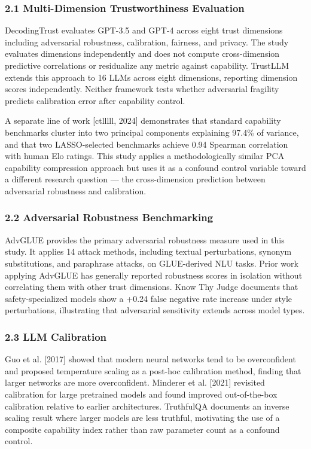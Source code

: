 
\subsubsection{2.1 Multi-Dimension Trustworthiness Evaluation}

DecodingTrust \citep{Wangetal2023} evaluates GPT-3.5 and GPT-4 across eight trust dimensions including adversarial robustness, calibration, fairness, and privacy. The study evaluates dimensions independently and does not compute cross-dimension predictive correlations or residualize any metric against capability. TrustLLM \citep{Sunetal2024} extends this approach to 16 LLMs across eight dimensions, reporting dimension scores independently. Neither framework tests whether adversarial fragility predicts calibration error after capability control.

A separate line of work [ctlllll, 2024] demonstrates that standard capability benchmarks cluster into two principal components explaining 97.4\% of variance, and that two LASSO-selected benchmarks achieve 0.94 Spearman correlation with human Elo ratings. This study applies a methodologically similar PCA capability compression approach but uses it as a confound control variable toward a different research question — the cross-dimension prediction between adversarial robustness and calibration.

\subsubsection{2.2 Adversarial Robustness Benchmarking}

AdvGLUE \citep{Wangetal2021} provides the primary adversarial robustness measure used in this study. It applies 14 attack methods, including textual perturbations, synonym substitutions, and paraphrase attacks, on GLUE-derived NLU tasks. Prior work applying AdvGLUE has generally reported robustness scores in isolation without correlating them with other trust dimensions. Know Thy Judge \citep{Eirasetal2025} documents that safety-specialized models show a +0.24 false negative rate increase under style perturbations, illustrating that adversarial sensitivity extends across model types.

\subsubsection{2.3 LLM Calibration}

Guo et al. [2017] showed that modern neural networks tend to be overconfident and proposed temperature scaling as a post-hoc calibration method, finding that larger networks are more overconfident. Minderer et al. [2021] revisited calibration for large pretrained models and found improved out-of-the-box calibration relative to earlier architectures. TruthfulQA \citep{Linetal2021} documents an inverse scaling result where larger models are less truthful, motivating the use of a composite capability index rather than raw parameter count as a confound control.

